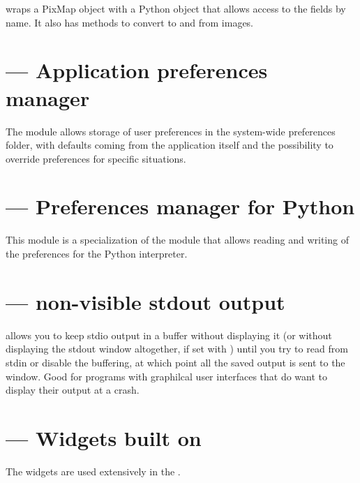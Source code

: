  wraps a PixMap object with a Python object that
allows access to the fields by name. It also has methods to convert
to and from  images.


\section{ --- Application preferences manager}

The  module allows storage of user preferences in
the system-wide preferences folder, with defaults coming from the
application itself and the possibility to override preferences for
specific situations.


\section{ --- Preferences manager for Python}

This module is a specialization of the  module
that allows reading and writing of the preferences for the Python
interpreter.


\section{ --- non-visible stdout output}

 allows you to keep stdio output in a buffer
without displaying it (or without displaying the stdout window
altogether, if set with ) until you try to read from
stdin or disable the buffering, at which point all the saved output is
sent to the window.  Good for programs with graphilcal user interfaces
that do want to display their output at a crash.


\section{ --- Widgets built on }

The  widgets are used extensively in the .
